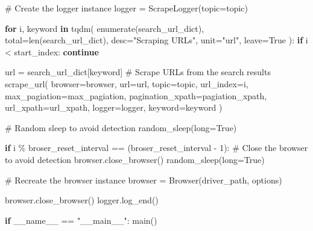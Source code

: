 \documentclass[
  titlepage]{article}
\newenvironment{Shaded}{\begin{snugshade}}{\end{snugshade}}
\newcommand{\BuiltInTok}[1]{\textcolor[rgb]{0.00,0.23,0.31}{#1}}
\newcommand{\CommentTok}[1]{\textcolor[rgb]{0.37,0.37,0.37}{#1}}
\newcommand{\ControlFlowTok}[1]{\textcolor[rgb]{0.00,0.23,0.31}{\textbf{#1}}}
\newcommand{\DecValTok}[1]{\textcolor[rgb]{0.68,0.00,0.00}{#1}}
\newcommand{\KeywordTok}[1]{\textcolor[rgb]{0.00,0.23,0.31}{\textbf{#1}}}
\newcommand{\NormalTok}[1]{\textcolor[rgb]{0.00,0.23,0.31}{#1}}
\newcommand{\OperatorTok}[1]{\textcolor[rgb]{0.37,0.37,0.37}{#1}}
\newcommand{\StringTok}[1]{\textcolor[rgb]{0.13,0.47,0.30}{#1}}
\newcommand{\VariableTok}[1]{\textcolor[rgb]{0.07,0.07,0.07}{#1}}
\begin{document}
\begin{Shaded}
\begin{Highlighting}[]
    \CommentTok{\# Create the logger instance}
\NormalTok{    logger }\OperatorTok{=}\NormalTok{ ScrapeLogger(topic}\OperatorTok{=}\NormalTok{topic)}

    \ControlFlowTok{for}\NormalTok{ i, keyword }\KeywordTok{in}\NormalTok{ tqdm(}
        \BuiltInTok{enumerate}\NormalTok{(search\_url\_dict),}
\NormalTok{        total}\OperatorTok{=}\BuiltInTok{len}\NormalTok{(search\_url\_dict),}
\NormalTok{        desc}\OperatorTok{=}\StringTok{"Scraping URLs"}\NormalTok{,}
\NormalTok{        unit}\OperatorTok{=}\StringTok{"url"}\NormalTok{,}
\NormalTok{        leave}\OperatorTok{=}\VariableTok{True}
\NormalTok{    ):}
        \ControlFlowTok{if}\NormalTok{ i }\OperatorTok{\textless{}}\NormalTok{ start\_index:}
            \ControlFlowTok{continue}

\NormalTok{        url }\OperatorTok{=}\NormalTok{ search\_url\_dict[keyword]}
        \CommentTok{\# Scrape URLs from the search results }
\NormalTok{        scrape\_url(}
\NormalTok{            browser}\OperatorTok{=}\NormalTok{browser, }
\NormalTok{            url}\OperatorTok{=}\NormalTok{url, }
\NormalTok{            topic}\OperatorTok{=}\NormalTok{topic, }
\NormalTok{            url\_index}\OperatorTok{=}\NormalTok{i, }
\NormalTok{            max\_pagiation}\OperatorTok{=}\NormalTok{max\_pagiation, }
\NormalTok{            pagination\_xpath}\OperatorTok{=}\NormalTok{pagiation\_xpath, }
\NormalTok{            url\_xpath}\OperatorTok{=}\NormalTok{url\_xpath, }
\NormalTok{            logger}\OperatorTok{=}\NormalTok{logger,}
\NormalTok{            keyword}\OperatorTok{=}\NormalTok{keyword}
\NormalTok{        )}

        \CommentTok{\# Random sleep to avoid detection}
\NormalTok{        random\_sleep(}\BuiltInTok{long}\OperatorTok{=}\VariableTok{True}\NormalTok{)}

        \ControlFlowTok{if}\NormalTok{ i }\OperatorTok{\%}\NormalTok{ broser\_reset\_interval }\OperatorTok{==}\NormalTok{ (broser\_reset\_interval }\OperatorTok{{-}} \DecValTok{1}\NormalTok{):}
            \CommentTok{\# Close the browser to avoid detection}
\NormalTok{            browser.close\_browser()}
\NormalTok{            random\_sleep(}\BuiltInTok{long}\OperatorTok{=}\VariableTok{True}\NormalTok{)}

            \CommentTok{\# Recreate the browser instance}
\NormalTok{            browser }\OperatorTok{=}\NormalTok{ Browser(driver\_path, options)}

\NormalTok{    browser.close\_browser()}
\NormalTok{    logger.log\_end()}

\ControlFlowTok{if} \VariableTok{\_\_name\_\_} \OperatorTok{==} \StringTok{"\_\_main\_\_"}\NormalTok{:}
\NormalTok{    main()}
\end{Highlighting}
\end{Shaded}
\end{document}
